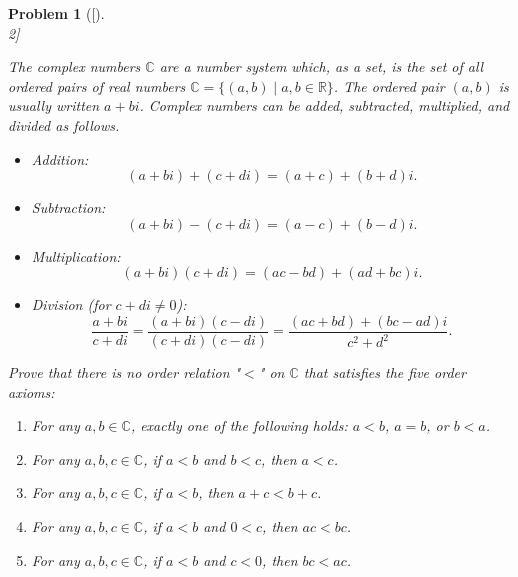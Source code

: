 \documentclass[12pt]{article}
\newtheorem{problemx}{Problem}
\newenvironment{problem}[1]{%
	\begin{problemx}[#1]\leavevmode\\[0.5em] %
	}{%
	\end{problemx}
}
\begin{document}
\begin{problem}[2]
	
	The complex numbers $\mathbb{C}$ are a number system which, as a set, is the set of all ordered pairs of real numbers $\mathbb{C} = \{(a,b) \mid a,b \in \mathbb{R}\}$. The ordered pair $(a,b)$ is usually written $a + bi$. Complex numbers can be added, subtracted, multiplied, and divided as follows.
	
	\begin{itemize}[leftmargin=*]
		\item Addition:
		\[
		(a + bi) + (c + di) = (a+c) + (b+d)i.
		\]
		\item Subtraction:
		\[
		(a + bi) - (c + di) = (a-c) + (b-d)i.
		\]
		\item Multiplication:
		\[
		(a + bi)(c + di) = (ac - bd) + (ad + bc)i.
		\]
		\item Division (for $c + di \neq 0$):
		\[
		\frac{a + bi}{c + di} = \frac{(a + bi)(c - di)}{(c + di)(c - di)} = \frac{(ac + bd) + (bc - ad)i}{c^2 + d^2}.
		\]
	\end{itemize}
	
	Prove that there is no order relation "$<$" on $\mathbb{C}$ that satisfies the five order axioms:
	
	\begin{enumerate}[leftmargin=*]
		\item For any $a,b \in \mathbb{C}$, exactly one of the following holds: $a < b$, $a = b$, or $b < a$.
		\item For any $a,b,c \in \mathbb{C}$, if $a < b$ and $b < c$, then $a < c$.
		\item For any $a,b,c \in \mathbb{C}$, if $a < b$, then $a + c < b + c$.
		\item For any $a,b,c \in \mathbb{C}$, if $a < b$ and $0 < c$, then $ac < bc$.
		\item For any $a,b,c \in \mathbb{C}$, if $a < b$ and $c < 0$, then $bc < ac$.
	\end{enumerate}
	
\end{problem}
\end{document}
